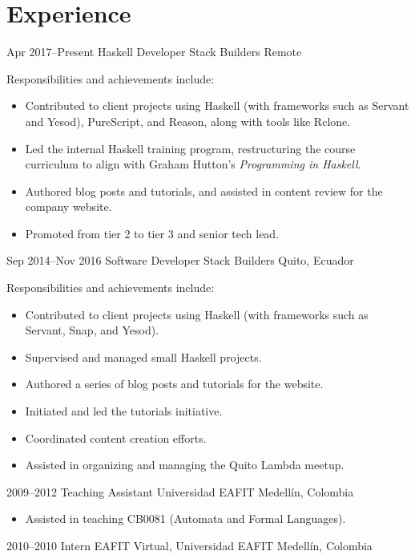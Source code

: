 \documentclass[letterpaper,sans,12pt]{moderncv}
\begin{document}
\makecvtitle

\section{Experience}

\cventry
  {Apr 2017--Present}
  {Haskell Developer}
  {Stack Builders}
  {Remote}
  {}
  {
    Responsibilities and achievements include:
    \begin{itemize}
      \item
        Contributed to client projects using Haskell (with frameworks
        such as Servant and Yesod), PureScript, and Reason, along with
        tools like Rclone.
      \item
        Led the internal Haskell training program, restructuring the
        course curriculum to align with Graham Hutton's
        \textit{Programming in Haskell}.
      \item
        Authored blog posts and tutorials, and assisted in content
        review for the company website.
      \item
        Promoted from tier 2 to tier 3 and senior tech lead.
    \end{itemize}
  }
\cventry
  {Sep 2014--Nov 2016}
  {Software Developer}
  {Stack Builders}
  {Quito, Ecuador}
  {}
  {
    Responsibilities and achievements include:
    \begin{itemize}
      \item
        Contributed to client projects using Haskell (with frameworks
        such as Servant, Snap, and Yesod).
      \item
        Supervised and managed small Haskell projects.
      \item
        Authored a series of blog posts and tutorials for the website.
      \item
        Initiated and led the tutorials initiative.
      \item
        Coordinated content creation efforts.
      \item
        Assisted in organizing and managing the Quito Lambda meetup.
    \end{itemize}
  }
\cventry
  {2009--2012}
  {Teaching Assistant}
  {Universidad EAFIT}
  {Medellín, Colombia}
  {}
  {
    \begin{itemize}
      \item
        Assisted in teaching CB0081 (Automata and Formal Languages).
    \end{itemize}
  }
\cventry
  {2010--2010}
  {Intern}
  {EAFIT Virtual, Universidad EAFIT}
  {Medellín, Colombia}
  {}
  {}
\end{document}
